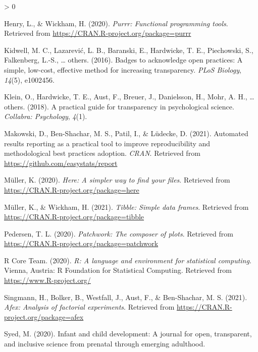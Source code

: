 \documentclass[
  english,
  man]{apa6}
\newlength{\cslhangindent}
\newenvironment{CSLReferences}[2] %
 {%
  \setlength{\parindent}{0pt}
  \ifodd #1 \everypar{\setlength{\hangindent}{\cslhangindent}}\ignorespaces\fi
  \ifnum #2 > 0
  \setlength{\parskip}{#2\baselineskip}
  \fi
 }%
 {}
\begin{document}
\begin{CSLReferences}{1}{0}
\leavevmode\hypertarget{ref-R-purrr}{}%
Henry, L., \& Wickham, H. (2020). \emph{Purrr: Functional programming tools}. Retrieved from \url{https://CRAN.R-project.org/package=purrr}

\leavevmode\hypertarget{ref-kidwell2016badges}{}%
Kidwell, M. C., Lazarević, L. B., Baranski, E., Hardwicke, T. E., Piechowski, S., Falkenberg, L.-S., \ldots{} others. (2016). Badges to acknowledge open practices: A simple, low-cost, effective method for increasing transparency. \emph{PLoS Biology}, \emph{14}(5), e1002456.

\leavevmode\hypertarget{ref-klein2018practical}{}%
Klein, O., Hardwicke, T. E., Aust, F., Breuer, J., Danielsson, H., Mohr, A. H., \ldots{} others. (2018). A practical guide for transparency in psychological science. \emph{Collabra: Psychology}, \emph{4}(1).

\leavevmode\hypertarget{ref-R-report}{}%
Makowski, D., Ben-Shachar, M. S., Patil, I., \& Lüdecke, D. (2021). Automated results reporting as a practical tool to improve reproducibility and methodological best practices adoption. \emph{CRAN}. Retrieved from \url{https://github.com/easystats/report}

\leavevmode\hypertarget{ref-R-here}{}%
Müller, K. (2020). \emph{Here: A simpler way to find your files}. Retrieved from \url{https://CRAN.R-project.org/package=here}

\leavevmode\hypertarget{ref-R-tibble}{}%
Müller, K., \& Wickham, H. (2021). \emph{Tibble: Simple data frames}. Retrieved from \url{https://CRAN.R-project.org/package=tibble}

\leavevmode\hypertarget{ref-R-patchwork}{}%
Pedersen, T. L. (2020). \emph{Patchwork: The composer of plots}. Retrieved from \url{https://CRAN.R-project.org/package=patchwork}

\leavevmode\hypertarget{ref-R-base}{}%
R Core Team. (2020). \emph{R: A language and environment for statistical computing}. Vienna, Austria: R Foundation for Statistical Computing. Retrieved from \url{https://www.R-project.org/}

\leavevmode\hypertarget{ref-R-afex}{}%
Singmann, H., Bolker, B., Westfall, J., Aust, F., \& Ben-Shachar, M. S. (2021). \emph{Afex: Analysis of factorial experiments}. Retrieved from \url{https://CRAN.R-project.org/package=afex}

\leavevmode\hypertarget{ref-syed2020infant}{}%
Syed, M. (2020). Infant and child development: A journal for open, transparent, and inclusive science from prenatal through emerging adulthood.


\end{CSLReferences}
\end{document}
